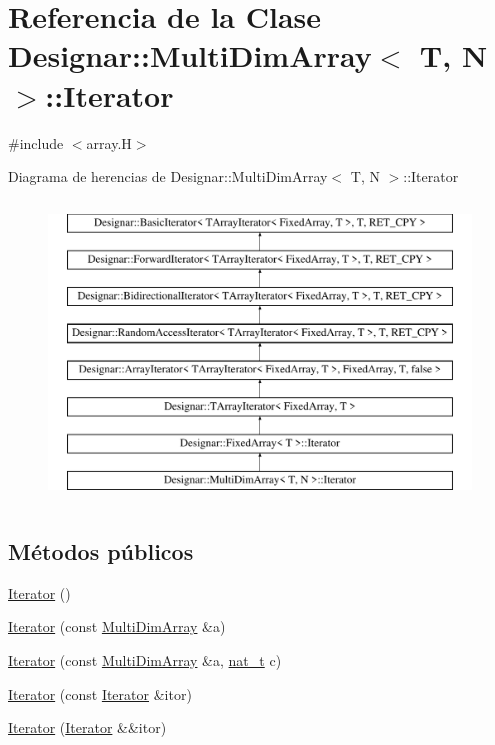 \hypertarget{class_designar_1_1_multi_dim_array_1_1_iterator}{}\section{Referencia de la Clase Designar\+:\+:Multi\+Dim\+Array$<$ T, N $>$\+:\+:Iterator}
\label{class_designar_1_1_multi_dim_array_1_1_iterator}


{\ttfamily \#include $<$array.\+H$>$}

Diagrama de herencias de Designar\+:\+:Multi\+Dim\+Array$<$ T, N $>$\+:\+:Iterator\begin{figure}[H]
\begin{center}
\leavevmode
\includegraphics[height=8.000000cm]{class_designar_1_1_multi_dim_array_1_1_iterator}
\end{center}
\end{figure}
\subsection*{Métodos públicos}
\begin{DoxyCompactItemize}
\item 
\hyperlink{class_designar_1_1_multi_dim_array_1_1_iterator_af627beb86cf5b1154f421078082b18f9}{Iterator} ()
\item 
\hyperlink{class_designar_1_1_multi_dim_array_1_1_iterator_a0b4865a27a5f64866d63376f24076b9f}{Iterator} (const \hyperlink{class_designar_1_1_multi_dim_array}{Multi\+Dim\+Array} \&a)
\item 
\hyperlink{class_designar_1_1_multi_dim_array_1_1_iterator_a557464a713807cd34a23a3c9cd29dbb0}{Iterator} (const \hyperlink{class_designar_1_1_multi_dim_array}{Multi\+Dim\+Array} \&a, \hyperlink{namespace_designar_aa72662848b9f4815e7bf31a7cf3e33d1}{nat\+\_\+t} c)
\item 
\hyperlink{class_designar_1_1_multi_dim_array_1_1_iterator_a2d0c217ae08b2203c50e1d1a01c3af40}{Iterator} (const \hyperlink{class_designar_1_1_multi_dim_array_1_1_iterator}{Iterator} \&itor)
\item 
\hyperlink{class_designar_1_1_multi_dim_array_1_1_iterator_af6ebf97caae786b50dcb6062b3ab7b0b}{Iterator} (\hyperlink{class_designar_1_1_multi_dim_array_1_1_iterator}{Iterator} \&\&itor)
\end{DoxyCompactItemize}
